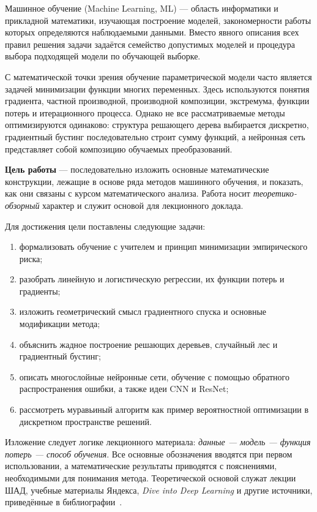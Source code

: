 \documentclass[12pt,a4paper]{article}
\begin{document}
Машинное обучение (Machine Learning, ML) --- область информатики и прикладной
математики, изучающая построение моделей, закономерности работы которых
определяются наблюдаемыми данными. Вместо явного описания всех правил решения
задачи задаётся семейство допустимых моделей и процедура выбора подходящей
модели по обучающей выборке.

С математической точки зрения обучение параметрической модели часто является
задачей минимизации функции многих переменных. Здесь используются понятия
градиента, частной производной, производной композиции, экстремума, функции
потерь и итерационного процесса. Однако не все рассматриваемые методы
оптимизируются одинаково: структура решающего дерева выбирается дискретно,
градиентный бустинг последовательно строит сумму функций, а нейронная сеть
представляет собой композицию обучаемых преобразований.

\textbf{Цель работы} --- последовательно изложить основные математические
конструкции, лежащие в основе ряда методов машинного обучения, и показать,
как они связаны с курсом математического анализа. Работа носит
\emph{теоретико-обзорный} характер и служит основой для лекционного доклада.

Для достижения цели поставлены следующие задачи:
\begin{enumerate}[label=\arabic*)]
    \item формализовать обучение с учителем и принцип минимизации эмпирического риска;
    \item разобрать линейную и логистическую регрессии, их функции потерь и градиенты;
    \item изложить геометрический смысл градиентного спуска и основные модификации метода;
    \item объяснить жадное построение решающих деревьев, случайный лес и градиентный бустинг;
    \item описать многослойные нейронные сети, обучение с помощью обратного распространения
    ошибки, а также идеи CNN и ResNet;
    \item рассмотреть муравьиный алгоритм как пример вероятностной оптимизации
    в дискретном пространстве решений.
\end{enumerate}

Изложение следует логике лекционного материала:
\emph{данные --- модель --- функция потерь --- способ обучения}.
Все основные обозначения вводятся при первом использовании, а математические
результаты приводятся с пояснениями, необходимыми для понимания метода.
Теоретической основой служат лекции ШАД, учебные материалы Яндекса,
\textit{Dive into Deep Learning} и другие источники,
приведённые в библиографии~\cite{shad-intro,shad-linreg,shad-logreg,yandex-ml,d2l-opt}.
\end{document}
